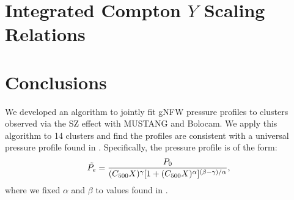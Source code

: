 \documentclass[iop,numberedappendix,apj]{emulateapj}
\begin{document}


\section{Integrated Compton $Y$ Scaling Relations}




\section{Conclusions}
\label{sec:conclusions}

We developed an algorithm to jointly fit gNFW pressure profiles to clusters observed via the SZ
effect with MUSTANG and Bolocam. We apply this algorithm to 14 clusters and find the profiles are 
consistent with a universal pressure profile found in \citet{arnaud2010}. Specifically, the 
pressure profile is of the form:
\begin{equation*}
  \Tilde{P_e} = \frac{P_0}{(C_{500} X)^{\gamma} [1 + (C_{500} X)^{\alpha}]^{(\beta - \gamma)/\alpha}},
\end{equation*}
where we fixed $\alpha$ and $\beta$ to values found in \citet{arnaud2010}. 
\end{document}
